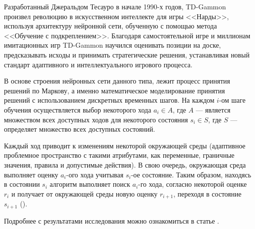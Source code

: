 Разработанный Джеральдом Тесауро в начале 1990-х годов, TD-Gammon произвел революцию в искусственном интеллекте для игры <<Нарды>>, используя архитектуру нейронной сети, обученную с помощью метода <<Обучение с подкреплением>>. Благодаря самостоятельной игре и миллионам имитационных игр TD-Gammon научился оценивать позиции на доске, предсказывать исходы и принимать стратегические решения, устанавливая новый стандарт адаптивного и интеллектуального игрового процесса.

В основе строения нейронных сети данного типа, лежит процесс принятия решений по Маркову, а именно математическое моделирование принятия решений с использованием дискретных временных шагов. На каждом $i$-ом шаге обучения осуществляется выбор некоторого хода $a_i \in A$, где $A$ --- является множеством всех доступных ходов для некоторого состояния $s_i \in S$, где $S$ --- определяет множество всех доступных состояний.

Каждый ход приводит к изменениям некоторой окружающей среды (адаптивное проблемное пространство с такими атрибутами, как переменные, граничные значения, правила и допустимые действия). В свою очередь, окружающая среда выполняет оценку $a_i$-ого хода учитывая $s_i$-ое состояние. Таким образом, находясь в состоянии $s_i$ алгоритм выполняет поиск $a_i$-го хода, согласно некоторой оценке $r_i$ и получает от окружающей среды новую оценку $r_{i + 1}$, переходя в состояние $s_{i + 1}$ ().


Подробнее с результатами исследования можно ознакомиться в статье \cite{tdl-gammon}.
